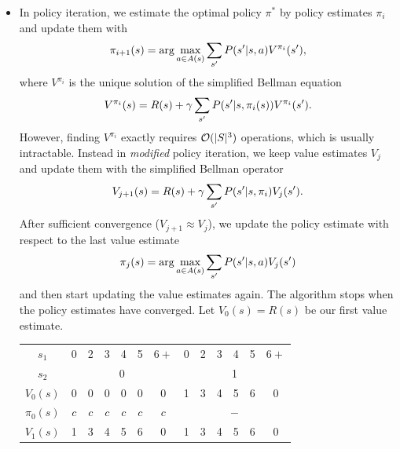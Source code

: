 \documentclass[11pt, a4paper]{article}
\begin{document}
\begin{enumerate}
\begin{solution}
\begin{itemize}
            \item In policy iteration, we estimate the optimal policy $\pi^*$ by policy estimates $\pi_i$ and update them with
            \begin{equation*}
                \pi_{i+1}(s) = \arg \max_{a \in A(s)} \sum_{s'} P(s' \vert s, a) V^{\pi_i}(s'),
            \end{equation*}
            where $V^{\pi_i}$ is the unique solution of the simplified Bellman equation
            \begin{equation*}
                V^{\pi_i}(s) = R(s) + \gamma \sum_{s'} P(s' \vert s, \pi_i(s)) V^{\pi_i}(s') .
            \end{equation*}
            However, finding $V^{\pi_i}$ exactly requires $\mathcal{O}(\lvert S\rvert^3)$ operations, which is usually intractable. Instead in \emph{modified} policy iteration, we keep value estimates $V_j$ and update them with the simplified Bellman operator
            \begin{equation*}
                V_{j + 1}(s) = R(s) + \gamma \sum_{s'} P(s' \vert s, \pi_i) V_j(s') .
            \end{equation*}
            After sufficient convergence ($V_{j+1} \approx V_{j}$), we update the policy estimate with respect to the last value estimate
            \begin{equation*}
                \pi_j(s) = \arg \max_{a \in A(s)} \sum_{s'} P(s' \vert s, a) V_j(s')
            \end{equation*}
            and then start updating the value estimates again. The algorithm stops when the policy estimates have converged. Let $V_0(s) = R(s)$ be our first value estimate.
            \begin{table}[H]
                \centering
                \begin{tabular}{c|cccccc|cccccc}
                    \toprule
                    $s_1$      & 0 & 2 & 3 & 4 & 5 & $6+$ & 0 & 2 & 3 & 4 & 5 & $6+$ \\
                    $s_2$      & \multicolumn{6}{c|}{0}   & \multicolumn{6}{c}{1}    \\
                    \midrule
                    $V_0(s)$   & 0 & 0 & 0 & 0 & 0 & 0    & 1 & 3 & 4 & 5 & 6 & 0    \\
                    $\pi_0(s)$ & $c$ & $c$ & $c$ & $c$ & $c$ & $c$ & \multicolumn{6}{c}{$-$} \\
                    $V_1(s)$   & 1 & 3 & 4 & 5 & 6 & 0    & 1 & 3 & 4 & 5 & 6 & 0    \\

\end{tabular}
\end{table}
\end{itemize}
\end{solution}
\end{enumerate}
\end{document}
